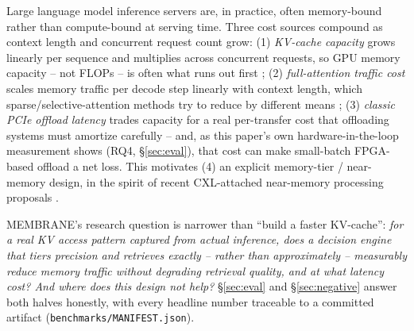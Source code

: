 \documentclass[11pt]{article}
\begin{document}
Large language model inference servers are, in practice, often
memory-bound rather than compute-bound at serving time. Three cost
sources compound as context length and concurrent request count grow:
(1) \emph{KV-cache capacity} grows linearly per sequence and multiplies
across concurrent requests, so GPU memory capacity -- not FLOPs -- is
often what runs out first \cite{kwon2023pagedattention,sheng2023flexgen};
(2) \emph{full-attention traffic cost} scales memory traffic per decode
step linearly with context length, which sparse/selective-attention
methods try to reduce by different means
\cite{zhang2023h2o,xiao2024streamingllm,tang2024quest}; (3)
\emph{classic PCIe offload latency} trades capacity for a real
per-transfer cost that offloading systems must amortize carefully
\cite{sheng2023flexgen,lee2024infinigen} -- and, as this paper's own
hardware-in-the-loop measurement shows (RQ4, \S\ref{sec:eval}), that
cost can make small-batch FPGA-based offload a net loss. This motivates
(4) an explicit memory-tier / near-memory design, in the spirit of
recent CXL-attached near-memory processing proposals
\cite{xie2025trace,kim2025pnmcxl}.

MEMBRANE's research question is narrower than ``build a faster
KV-cache'': \emph{for a real KV access pattern captured from actual
inference, does a decision engine that tiers precision and retrieves
exactly -- rather than approximately -- measurably reduce memory
traffic without degrading retrieval quality, and at what latency cost?
And where does this design not help?} \S\ref{sec:eval} and
\S\ref{sec:negative} answer both halves honestly, with every headline
number traceable to a committed artifact (\texttt{benchmarks/MANIFEST.json}).
\end{document}
